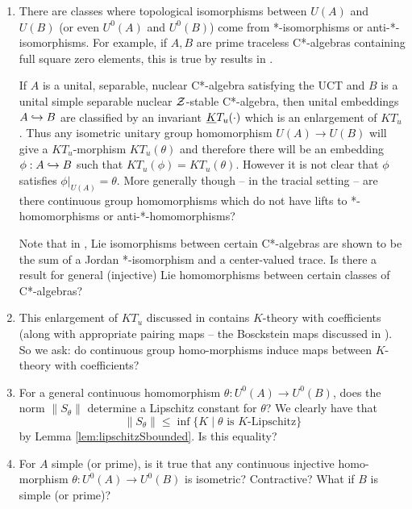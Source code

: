 \documentclass[12pt]{amsart}
\begin{document}
\begin{enumerate}
\item There are classes where topological isomorphisms between $U(A)$ and $U(B)$ (or even $U^0(A)$ and $U^0(B)$) come from *-isomorphisms or anti-*-isomorphisms. For example, if $A,B$ are prime traceless C*-algebras containing full square zero elements, this is true by results in \cite{ChandRobert23}.

If $A$ is a unital, separable, nuclear C*-algebra satisfying the UCT and $B$ is a unital simple separable nuclear $\mathcal{Z}$-stable C*-algebra, then unital embeddings $A \hookrightarrow B$ are classified by an invariant $\underline{K}T_u(\cdot)$ which is an enlargement of $KT_u$ \cite{CGSTW23}. Thus any isometric unitary group homomorphism $U(A) \to U(B)$ will give a $KT_u$-morphism $KT_u(\theta)$ and therefore there will be an embedding $\phi:A \hookrightarrow B$ such that $KT_u(\phi) = KT_u(\theta)$. However it is not clear that $\phi$ satisfies $\phi|_{U(A)} = \theta$. More generally though -- in the tracial setting -- are there continuous group homomorphisms which do not have lifts to *-homomorphisms or anti-*-homomorphisms?

Note that in \cite[Chapter 6]{AraMathieubook}, Lie isomorphisms between certain C*-algebras are shown to be the sum of a Jordan *-isomorphism and a center-valued trace. Is there a result for general (injective) Lie homomorphisms between certain classes of C*-algebras?

\item This enlargement of $KT_u$ discussed in \cite{CGSTW23} contains $K$-theory with coefficients (along with appropriate pairing maps -- the Bosckstein maps discussed in \cite{SchochetIV}). So we ask: do continuous group homo\hyp{}morphisms induce maps between $K$-theory with coefficients?

\item For a general continuous homomorphism $\theta: U^0(A) \to U^0(B)$, does the norm $\|S_\theta\|$ determine a Lipschitz constant for $\theta$? We clearly have that
\begin{equation}
\|S_\theta\| \leq \inf\{ K \mid \theta \text{ is }K\text{-Lipschitz}\}
\end{equation}
by Lemma \ref{lem:lipschitzSbounded}. Is this equality?
\item For $A$ simple (or prime), is it true that any continuous injective homo\hyp{}morphism $\theta: U^0(A) \to U^0(B)$ is isometric? Contractive? What if $B$ is simple (or prime)?


\end{enumerate}
\end{document}

